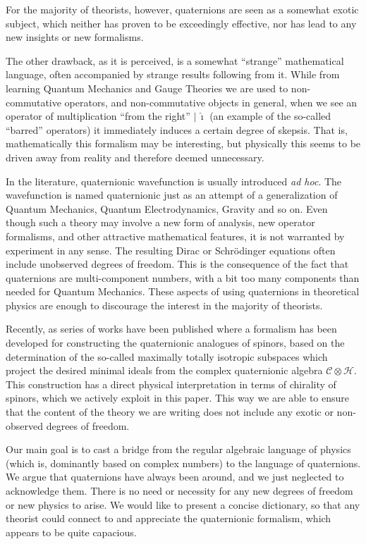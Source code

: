 \documentclass[epsfig,12pt]{article}
\newcommand{\ii}{\hat\imath}
\newcommand{\cc}{\mathcal{C}}
\newcommand{\ch}{\mathcal{H}}
\begin{document}
	For the majority of theorists, however, quaternions are seen as a somewhat exotic subject,
	which neither has proven to be exceedingly effective, nor has lead
	to any new insights or new formalisms.

	The other drawback, as it is perceived, is a somewhat ``strange'' mathematical language,
        often accompanied by strange results following from it.
	While from learning Quantum Mechanics and Gauge Theories we are used to non-commutative operators,
	and non-commutative objects in general, when we see an operator of multiplication ``from the right'' $ |\, \ii $
        (an example of the so-called ``barred'' operators) it immediately induces a certain degree of skepsis.
	That is, mathematically this formalism may be interesting, but physically this seems to be
	driven away from reality and therefore deemed unnecessary.

	In the literature, quaternionic wavefunction is usually introduced \emph{ad hoc}.
	The wavefunction is named quaternionic just as an attempt of a generalization of Quantum Mechanics,
	Quantum Electrodynamics, Gravity and so on.
	Even though such a theory may involve a new form of analysis, new operator formalisms,
	and other attractive mathematical features, it is not warranted by experiment in any sense. 
	The resulting Dirac or Schr\"odinger equations often include unobserved degrees of freedom.
	This is the consequence of the fact that quaternions are multi-component numbers,
        with a bit too many components than needed for Quantum Mechanics.
        These aspects of using quaternions in theoretical physics are enough to discourage the interest in the
        majority of theorists.

	Recently, as series of works have been published where a formalism has been developed for constructing
	the quaternionic analogues of spinors, based on the determination of the so-called
	maximally totally isotropic subspaces which project the desired minimal ideals from the
	complex quaternionic algebra $ \cc \otimes \ch $.
	This construction has a direct physical interpretation in terms of chirality of spinors,
	which we actively exploit in this paper.
	This way we are able to ensure that the content of the theory we are writing does not
	include any exotic or non-observed degrees of freedom.

	Our main goal is to cast a bridge from the regular algebraic language of physics (which is, dominantly based
	on complex numbers) to the language of quaternions.
	We argue that quaternions have always been around, and we just neglected to acknowledge them.
	There is no need or necessity for any new degrees of freedom or new physics to arise.
	We would like to present a concise dictionary, so that any theorist could connect to and appreciate
	the quaternionic formalism, which appears to be quite capacious.
\end{document}
